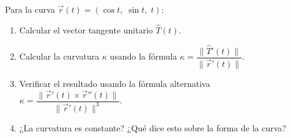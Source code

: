 Para la curva $\vec{r}(t) = (\cos t,\; \sin t,\; t)$:
\begin{enumerate}
    \item Calcular el vector tangente unitario $\hat{T}(t)$.
    \item Calcular la curvatura $\kappa$ usando la fórmula $\kappa = \dfrac{\|\hat{T}'(t)\|}{\|\vec{r}'(t)\|}$.
    \item Verificar el resultado usando la fórmula alternativa $\kappa = \dfrac{\|\vec{r}'(t) \times \vec{r}''(t)\|}{\|\vec{r}'(t)\|^3}$.
    \item ¿La curvatura es constante? ¿Qué dice esto sobre la forma de la curva?
\end{enumerate}